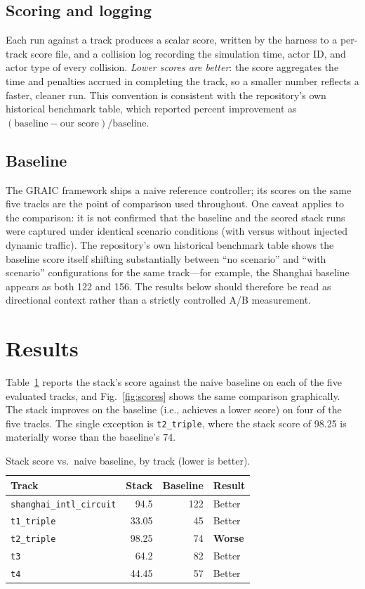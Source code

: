 \documentclass[conference]{IEEEtran}
\begin{document}
\subsection{Scoring and logging}
Each run against a track produces a scalar score, written by the harness to a
per-track score file, and a collision log recording the simulation time, actor
ID, and actor type of every collision. \emph{Lower scores are better}: the
score aggregates the time and penalties accrued in completing the track, so a
smaller number reflects a faster, cleaner run. This convention is consistent
with the repository's own historical benchmark table, which reported percent
improvement as $(\text{baseline} - \text{our score})/\text{baseline}$.

\subsection{Baseline}
The GRAIC framework ships a naive reference controller; its scores on the same
five tracks are the point of comparison used throughout. One caveat applies to
the comparison: it is not confirmed that the baseline and the scored stack runs
were captured under identical scenario conditions (with versus without injected
dynamic traffic). The repository's own historical benchmark table shows the
baseline score itself shifting substantially between ``no scenario'' and ``with
scenario'' configurations for the same track---for example, the Shanghai
baseline appears as both 122 and 156. The results below should therefore be read
as directional context rather than a strictly controlled A/B measurement.

\section{Results}

Table~\ref{tab:scores} reports the stack's score against the naive baseline on
each of the five evaluated tracks, and Fig.~\ref{fig:scores} shows the same
comparison graphically. The stack improves on the baseline (i.e., achieves a
lower score) on four of the five tracks. The single exception is
\texttt{t2\_triple}, where the stack score of 98.25 is materially worse than the
baseline's 74.

\begin{table}[t]
\centering
\caption{Stack score vs.\ naive baseline, by track (lower is better).}
\label{tab:scores}
\begin{tabular}{lrrl}
\toprule
Track & Stack & Baseline & Result \\
\midrule
\texttt{shanghai\_intl\_circuit} & 94.5  & 122 & Better \\
\texttt{t1\_triple}              & 33.05 & 45  & Better \\
\texttt{t2\_triple}              & 98.25 & 74  & \textbf{Worse} \\
\texttt{t3}                      & 64.2  & 82  & Better \\
\texttt{t4}                      & 44.45 & 57  & Better \\
\bottomrule
\end{tabular}
\end{table}
\end{document}
